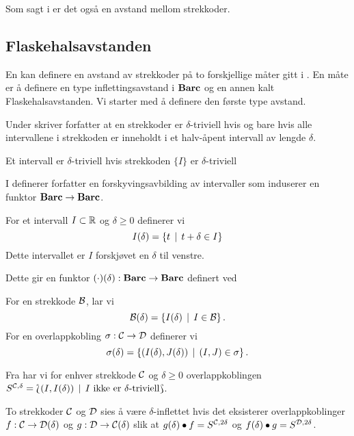 Som sagt i  er det også en
avstand mellom strekkoder.

\subsection{Flaskehalsavstanden}
En kan definere en avstand av strekkoder på to
forskjellige måter gitt i \cite{Bauer2020}. En måte er
å definere en type inflettingsavstand i $\textnormal{\textbf{Barc}}$ og en annen
kalt Flaskehalsavstanden. Vi starter med å definere den
første type avstand.

\begin{bemerk}\label{bem:strek_triv}
  Under \citep[definisjon 1.3]{Bauer2020} skriver
  forfatter at en strekkoder er $\delta$-triviell hvis og
  bare hvis alle intervallene i strekkoden er inneholdt
  i et halv-åpent intervall av lengde $\delta$.
\end{bemerk}

\begin{bemerk}\label{bem:int_triv}
  Et intervall er $\delta$-triviell hvis strekkoden
  $\{I\}$ er $\delta$-triviell
\end{bemerk}

I \citep[seksjon 2.5]{Bauer2020} definerer forfatter en
forskyvingsavbilding av intervaller som induserer en
funktor $\textnormal{\textbf{Barc}}\to\textnormal{\textbf{Barc}}$.
\begin{definisjon}\label{def:IntSkyv}
    For et intervall $I\subset\mathbb{R}$ og $\delta\geq 0$ definerer vi
    \[I(\delta) = \left\{t\,\mid\,t+\delta\in I\right\}\]
    Dette intervallet er $I$ forskjøvet en $\delta$ til venstre.
\end{definisjon}

Dette gir en funktor $(\cdot)(\delta):\textnormal{\textbf{Barc}}\to\textnormal{\textbf{Barc}}$ definert ved

\begin{definisjon}
    For en strekkode $\mathcal{B}$, lar vi
    \[\mathcal{B}(\delta) = \left\{I(\delta)\,\mid\,I\in\mathcal{B}\right\}.\]
    For en overlappkobling $\sigma:\mathcal{C}\to\mathcal{D}$ definerer vi
    \[\sigma(\delta) = \left\{(I(\delta),J(\delta))\,\mid\,(I,J)\in\sigma\right\}.\]
\end{definisjon}

Fra \cite{Bauer2020} har vi for enhver strekkode $\mathcal{C}$
og $\delta\geq0$ overlappkoblingen $S^{\mathcal{C},\delta}
= \Lbag (I,I(\delta))\,\mid\, \text{$I$ ikke er
$\delta$-triviell}\Rbag$.

\begin{definisjon}\label{def:InfBar}
To strekkoder $\mathcal{C}$ og $\mathcal{D}$ sies å være
  $\delta$-inflettet hvis det eksisterer overlappkoblinger
  $f:\mathcal{C}\to \mathcal{D}(\delta)$ og $g:\mathcal{D}\to\mathcal{C}(\delta)$
  slik at $g(\delta)\bullet f = S^{\mathcal{C},2\delta}$ og
  $f(\delta)\bullet g=S^{\mathcal{D},2\delta}$.
\end{definisjon}

